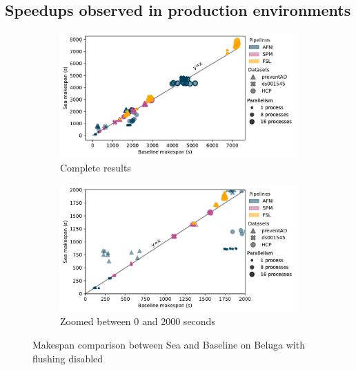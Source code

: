 \subsection{Speedups observed in production environments}

\begin{figure}

\begin{subfigure}{\textwidth}
    \centering
    \captionsetup{width=.85\linewidth}
    \includegraphics[width=\columnwidth]{figures/sea-neuro/beluga_withoutflush_nozoom.pdf}%
    \caption{Complete results}\label{fig:seaneuro:belugafull}
\end{subfigure}
\begin{subfigure}{\textwidth}
    \centering
    \captionsetup{width=.85\linewidth}
    \includegraphics[width=\linewidth]{figures/sea-neuro/beluga_withoutflush_zoom.pdf}
    \caption{Zoomed between 0 and 2000 seconds}\label{fig:seaneuro:belugazoom}
\end{subfigure}
\caption{Makespan comparison between Sea and Baseline on Beluga with flushing disabled}
\label{fig:seaneuro:beluga-noflush}
\end{figure}

